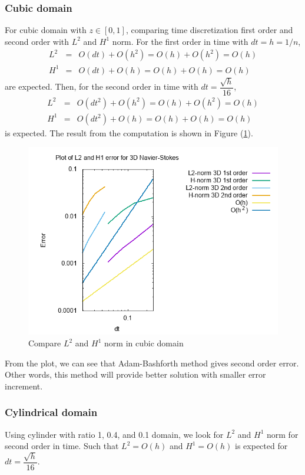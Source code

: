 \documentclass[a4paper]{article}
\begin{document}
\subsubsection{Cubic domain}
For cubic domain with $ z \in [0,1] $, comparing time discretization first order and second order with $ L^{2} $ and $ H^{1} $ norm. For the first order in time with $ dt = h = 1/n $,
\begin{eqnarray}\nonumber
L^{2} &=& O(dt) + O(h^2) = O(h) + O(h^2) = O(h)\\ \nonumber
H^{1} &=& O(dt) + O(h) = O(h) + O(h) = O(h)
\end{eqnarray}
are expected. Then, for the second order in time with $ dt = \dfrac{\sqrt{h}}{16} $,
\begin{eqnarray}\nonumber
L^{2} &=& O(dt^2) + O(h^2) = O(h) + O(h^2) = O(h)\\ \nonumber
H^{1} &=& O(dt^2) + O(h) = O(h) + O(h) = O(h)
\end{eqnarray}
is expected. The result from the computation is shown in Figure (\ref{fig:errorns3d}).

\begin{figure}[h!]
	\centering
	\includegraphics[width=1\linewidth]{NS_3D/error_NS_3D}
	\caption{Compare $ L^{2} $ and $ H^{1} $ norm in cubic domain}
	\label{fig:errorns3d}
\end{figure}

From the plot, we can see that Adam-Bashforth method gives second order error. Other words, this method will provide better solution with smaller error increment. 

\subsubsection{Cylindrical domain}
Using cylinder with ratio 1, 0.4, and 0.1 domain, we look for $ L^{2} $ and $ H^{1} $ norm for second order in time. Such that $ L^{2} = O(h) $ and $ H^{1} = O(h) $ is expected for $ dt = \dfrac{\sqrt{h}}{16}. $
\end{document}
